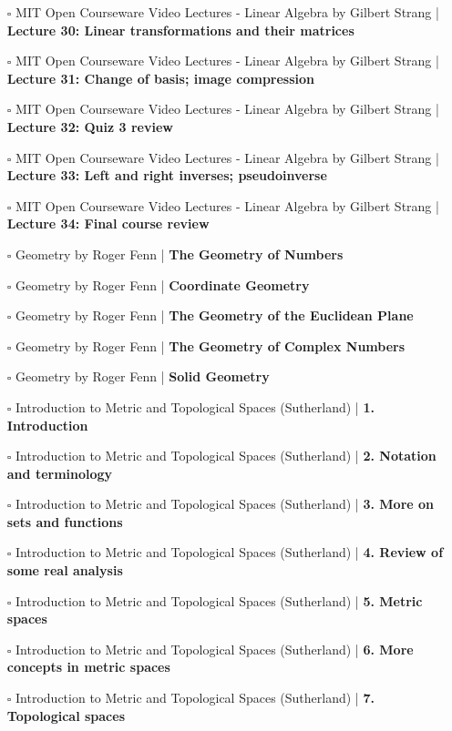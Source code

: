 \documentclass[a4, landscape, 12pt]{article}
\newcommand{\checkbox}{$\square$}%
\begin{document}
\begin{itemize}
{}
\item [\checkbox] MIT Open Courseware Video Lectures - Linear Algebra by Gilbert Strang  | \textbf{Lecture 30: Linear transformations and their matrices
}
\item [\checkbox] MIT Open Courseware Video Lectures - Linear Algebra by Gilbert Strang  | \textbf{Lecture 31: Change of basis; image compression
}
\item [\checkbox] MIT Open Courseware Video Lectures - Linear Algebra by Gilbert Strang  | \textbf{Lecture 32: Quiz 3 review
}
\item [\checkbox] MIT Open Courseware Video Lectures - Linear Algebra by Gilbert Strang  | \textbf{Lecture 33: Left and right inverses; pseudoinverse
}
\item [\checkbox] MIT Open Courseware Video Lectures - Linear Algebra by Gilbert Strang  | \textbf{Lecture 34: Final course review
}
\item [\checkbox] Geometry by Roger Fenn  | \textbf{The Geometry of Numbers
}
\item [\checkbox] Geometry by Roger Fenn  | \textbf{Coordinate Geometry
}
\item [\checkbox] Geometry by Roger Fenn  | \textbf{The Geometry of the Euclidean Plane
}
\item [\checkbox] Geometry by Roger Fenn  | \textbf{The Geometry of Complex Numbers
}
\item [\checkbox] Geometry by Roger Fenn  | \textbf{Solid Geometry
}
\item [\checkbox] Introduction to Metric and Topological Spaces (Sutherland)  | \textbf{1. Introduction
}
\item [\checkbox] Introduction to Metric and Topological Spaces (Sutherland)  | \textbf{2. Notation and terminology
}
\item [\checkbox] Introduction to Metric and Topological Spaces (Sutherland)  | \textbf{3. More on sets and functions
}
\item [\checkbox] Introduction to Metric and Topological Spaces (Sutherland)  | \textbf{4. Review of some real analysis
}
\item [\checkbox] Introduction to Metric and Topological Spaces (Sutherland)  | \textbf{5. Metric spaces
}
\item [\checkbox] Introduction to Metric and Topological Spaces (Sutherland)  | \textbf{6. More concepts in metric spaces
}
\item [\checkbox] Introduction to Metric and Topological Spaces (Sutherland)  | \textbf{7. Topological spaces
}
\end{itemize}
\end{document}
